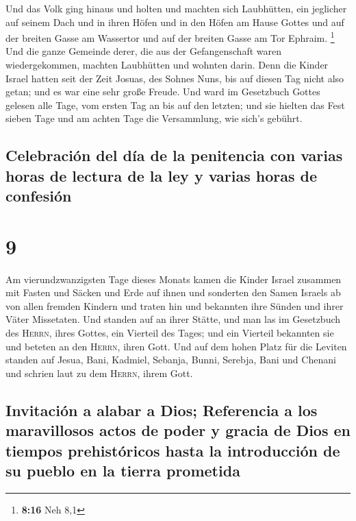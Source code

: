  Und das Volk ging hinaus und holten und machten sich
Laubhütten, ein jeglicher auf seinem Dach und in ihren Höfen und in den
Höfen am Hause Gottes und auf der breiten Gasse am Wassertor und auf der
breiten Gasse am Tor Ephraim. \footnote{\textbf{8:16} Neh 8,1}
 Und die ganze Gemeinde derer, die aus der Gefangenschaft
waren wiedergekommen, machten Laubhütten und wohnten darin. Denn die
Kinder Israel hatten seit der Zeit Josuas, des Sohnes Nuns, bis auf
diesen Tag nicht also getan; und es war eine sehr große Freude.
 Und ward im Gesetzbuch Gottes gelesen alle Tage, vom
ersten Tag an bis auf den letzten; und sie hielten das Fest sieben Tage
und am achten Tage die Versammlung, wie sich's gebührt.

\hypertarget{celebraciuxf3n-del-duxeda-de-la-penitencia-con-varias-horas-de-lectura-de-la-ley-y-varias-horas-de-confesiuxf3n}{%
\subsection{Celebración del día de la penitencia con varias horas de
lectura de la ley y varias horas de
confesión}\label{celebraciuxf3n-del-duxeda-de-la-penitencia-con-varias-horas-de-lectura-de-la-ley-y-varias-horas-de-confesiuxf3n}}

\hypertarget{section-8}{%
\section{9}\label{section-8}}

 Am vierundzwanzigsten Tage dieses Monats kamen die Kinder
Israel zusammen mit Fasten und Säcken und Erde auf ihnen 
und sonderten den Samen Israels ab von allen fremden Kindern und traten
hin und bekannten ihre Sünden und ihrer Väter Missetaten. 
Und standen auf an ihrer Stätte, und man las im Gesetzbuch des
\textsc{Herrn}, ihres Gottes, ein Vierteil des Tages; und ein Vierteil
bekannten sie und beteten an den \textsc{Herrn}, ihren Gott.
 Und auf dem hohen Platz für die Leviten standen auf
Jesua, Bani, Kadmiel, Sebanja, Bunni, Serebja, Bani und Chenani und
schrien laut zu dem \textsc{Herrn}, ihrem Gott.

\hypertarget{invitaciuxf3n-a-alabar-a-dios-referencia-a-los-maravillosos-actos-de-poder-y-gracia-de-dios-en-tiempos-prehistuxf3ricos-hasta-la-introducciuxf3n-de-su-pueblo-en-la-tierra-prometida}{%
\subsection{Invitación a alabar a Dios; Referencia a los maravillosos
actos de poder y gracia de Dios en tiempos prehistóricos hasta la
introducción de su pueblo en la tierra
prometida}\label{invitaciuxf3n-a-alabar-a-dios-referencia-a-los-maravillosos-actos-de-poder-y-gracia-de-dios-en-tiempos-prehistuxf3ricos-hasta-la-introducciuxf3n-de-su-pueblo-en-la-tierra-prometida}}

